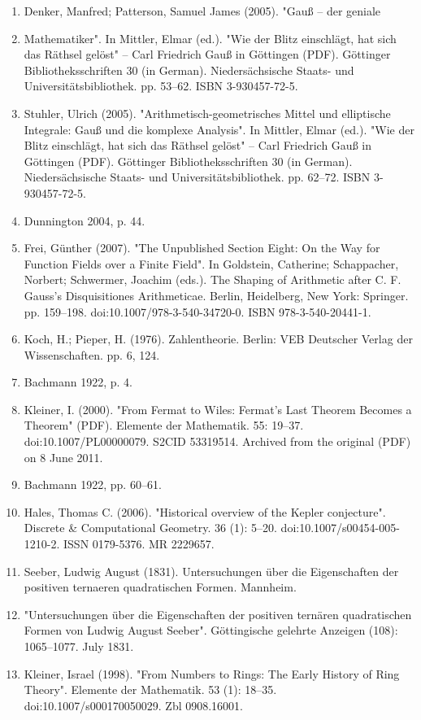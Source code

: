 \begin{enumerate}
\item Denker, Manfred; Patterson, Samuel James (2005). "Gauß – der geniale \item Mathematiker". In Mittler, Elmar (ed.). "Wie der Blitz einschlägt, hat sich das Räthsel gelöst" – Carl Friedrich Gauß in Göttingen (PDF). Göttinger Bibliotheksschriften 30 (in German). Niedersächsische Staats- und Universitätsbibliothek. pp. 53–62. ISBN 3-930457-72-5.
\item Stuhler, Ulrich (2005). "Arithmetisch-geometrisches Mittel und elliptische Integrale: Gauß und die komplexe Analysis". In Mittler, Elmar (ed.). "Wie der Blitz einschlägt, hat sich das Räthsel gelöst" – Carl Friedrich Gauß in Göttingen (PDF). Göttinger Bibliotheksschriften 30 (in German). Niedersächsische Staats- und Universitätsbibliothek. pp. 62–72. ISBN 3-930457-72-5.
\item Dunnington 2004, p. 44.
\item Frei, Günther (2007). "The Unpublished Section Eight: On the Way for Function Fields over a Finite Field". In Goldstein, Catherine; Schappacher, Norbert; Schwermer, Joachim (eds.). The Shaping of Arithmetic after C. F. Gauss's Disquisitiones Arithmeticae. Berlin, Heidelberg, New York: Springer. pp. 159–198. doi:10.1007/978-3-540-34720-0. ISBN 978-3-540-20441-1.
\item Koch, H.; Pieper, H. (1976). Zahlentheorie. Berlin: VEB Deutscher Verlag der Wissenschaften. pp. 6, 124.
\item Bachmann 1922, p. 4.
\item Kleiner, I. (2000). "From Fermat to Wiles: Fermat's Last Theorem Becomes a Theorem" (PDF). Elemente der Mathematik. 55: 19–37. doi:10.1007/PL00000079. S2CID 53319514. Archived from the original (PDF) on 8 June 2011.
\item Bachmann 1922, pp. 60–61.
\item Hales, Thomas C. (2006). "Historical overview of the Kepler conjecture". Discrete & Computational Geometry. 36 (1): 5–20. doi:10.1007/s00454-005-1210-2. ISSN 0179-5376. MR 2229657.
\item Seeber, Ludwig August (1831). Untersuchungen über die Eigenschaften der positiven ternaeren quadratischen Formen. Mannheim.
\item "Untersuchungen über die Eigenschaften der positiven ternären quadratischen Formen von Ludwig August Seeber". Göttingische gelehrte Anzeigen (108): 1065–1077. July 1831.
\item Kleiner, Israel (1998). "From Numbers to Rings: The Early History of Ring Theory". Elemente der Mathematik. 53 (1): 18–35. doi:10.1007/s000170050029. Zbl 0908.16001.

\end{enumerate}
